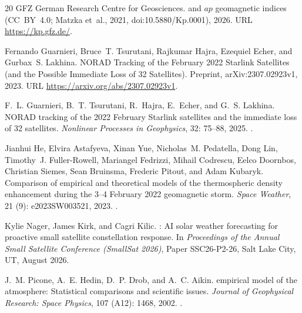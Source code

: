 \documentclass[12pt]{article}
\begin{document}
\begin{thebibliography}{20}
{GFZ German Research Centre for Geosciences}.
 and $ap$ geomagnetic indices (CC~BY~4.0; Matzka et~al., 2021, doi:10.5880/Kp.0001), 2026.
\newblock URL \url{https://kp.gfz.de/}.

Fernando Guarnieri, Bruce~T. Tsurutani, Rajkumar Hajra, Ezequiel Echer, and Gurbax~S. Lakhina.
\newblock NORAD Tracking of the February 2022 Starlink Satellites (and the Possible Immediate Loss of 32 Satellites).
\newblock Preprint, arXiv:2307.02923v1, 2023.
\newblock URL \url{https://arxiv.org/abs/2307.02923v1}.

F.~L. Guarnieri, B.~T. Tsurutani, R.~Hajra, E.~Echer, and G.~S. Lakhina.
\newblock NORAD tracking of the 2022 February Starlink satellites and the
  immediate loss of 32 satellites.
\newblock \emph{Nonlinear Processes in Geophysics}, 32: 75--88, 2025.
\newblock {}.

Jianhui He, Elvira Astafyeva, Xinan Yue, Nicholas~M. Pedatella, Dong Lin,
  Timothy~J. Fuller-Rowell, Mariangel Fedrizzi, Mihail Codrescu, Eelco
  Doornbos, Christian Siemes, Sean Bruinsma, Frederic Pitout, and Adam Kubaryk.
\newblock Comparison of empirical and theoretical models of the thermospheric
  density enhancement during the 3--4 {February} 2022 geomagnetic storm.
\newblock \emph{Space Weather}, 21 (9): e2023SW003521, 2023.
\newblock {}.

Kylie Nager, James Kirk, and Cagri Kilic.
: {AI} solar weather forecasting for proactive small satellite
  constellation response.
\newblock In \emph{Proceedings of the Annual Small Satellite Conference
  (SmallSat 2026)}, Paper SSC26-P2-26, Salt Lake City, UT, August 2026.

J.~M. Picone, A.~E. Hedin, D.~P. Drob, and A.~C. Aikin.
 empirical model of the atmosphere: Statistical
  comparisons and scientific issues.
\newblock \emph{Journal of Geophysical Research: Space Physics}, 107
  (A12): 1468, 2002.
\newblock {}.


\end{thebibliography}
\end{document}
